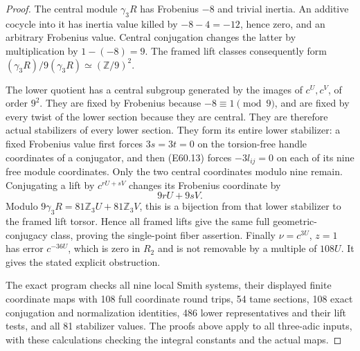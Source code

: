 \begin{proof}
The central module $\gamma_3R$ has Frobenius $-8$ and
trivial inertia. An additive cocycle into it has inertia
value killed by $-8-4=-12$, hence zero, and an arbitrary
Frobenius value. Central conjugation changes the latter
by multiplication by $1-(-8)=9$.
The framed lift classes consequently form
$(\gamma_3R)/9(\gamma_3R)\simeq(\mathbb Z/9)^2$.

The lower quotient has a central subgroup generated by
the images of $c^U,c^V$, of order $9^2$.
They are fixed by Frobenius because $-8\equiv1\pmod9$,
and are fixed by every twist of the lower section
because they are central. They are therefore actual
stabilizers of every lower section.
They form its entire lower stabilizer: a fixed Frobenius
value first forces $3s=3t=0$ on the torsion-free handle
coordinates of a conjugator, and then (E60.13) forces
$-3l_{ij}=0$ on each of its nine free module coordinates.
Only the two central coordinates modulo nine remain.
Conjugating a lift by $c^{rU+sV}$ changes its Frobenius
coordinate by
\[
                          9rU+9sV.
 \tag{E60.16}
\]
Modulo $9\gamma_3R=81\mathbb Z_3U+81\mathbb Z_3V$,
this is a bijection from that lower stabilizer to the
framed lift torsor. Hence all framed lifts give the
same full geometric-conjugacy class, proving the
single-point fiber assertion. Finally $\nu=c^{3U}$,
$z=1$ has error $c^{-36U}$, which is zero in $R_2$
and is not removable by a multiple of $108U$.
It gives the stated explicit obstruction.

The exact program checks all nine local Smith systems,
their displayed finite coordinate maps with 108 full
coordinate round trips, 54 tame sections, 108 exact
conjugation and normalization identities, 486 lower
representatives and their lift tests, and all 81
stabilizer values. The proofs above apply to all
three-adic inputs, with these calculations checking
the integral constants and the actual maps.
\end{proof}
